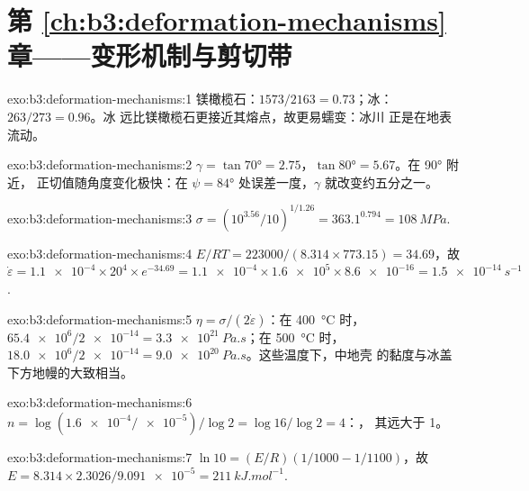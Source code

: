 \section*{第 \ref{ch:b3:deformation-mechanisms} 章——变形机制与剪切带}

\begin{solution}{exo:b3:deformation-mechanisms:1}
镁橄榄石：$1573/2163 = 0.73$；冰：$263/273 = 0.96$。冰
远比镁橄榄石更接近其熔点，故更易蠕变：冰川
正是在地表流动。
\end{solution}

\begin{solution}{exo:b3:deformation-mechanisms:2}
$\gamma = \tan\ang{70} = 2.75$，$\tan\ang{80} = 5.67$。在 \ang{90} 附近，
正切值随角度变化极快：在 $\psi =
\ang{84}$ 处误差一度，$\gamma$ 就改变约五分之一。
\end{solution}

\begin{solution}{exo:b3:deformation-mechanisms:3}
$\sigma = (10^{3.56}/10)^{1/1.26} = 363.1^{0.794} = \qty{108}{MPa}$.
\end{solution}

\begin{solution}{exo:b3:deformation-mechanisms:4}
$E/RT = 223000/(8.314\times773.15) = 34.69$，故 $\dot\varepsilon =
\num{1.1e-4}\times20^4\times e^{-34.69} = \num{1.1e-4}\times\num{1.6e5}\times
\num{8.6e-16} = \qty{1.5e-14}{s^{-1}}$.
\end{solution}

\begin{solution}{exo:b3:deformation-mechanisms:5}
$\eta = \sigma/(2\dot\varepsilon)$：在 \qty{400}{\celsius} 时，$\num{65.4e6}/\num{2e-14} =
\qty{3.3e21}{Pa.s}$；在 \qty{500}{\celsius} 时，$\num{18.0e6}/\num{2e-14} =
\qty{9.0e20}{Pa.s}$。这些温度下，中地壳
的黏度与冰盖下方地幔的大致相当。
\end{solution}

\begin{solution}{exo:b3:deformation-mechanisms:6}
$n = \log(\num{1.6e-4}/\num{e-5})/\log2 = \log16/\log2 = 4$：，
其远大于 1。
\end{solution}

\begin{solution}{exo:b3:deformation-mechanisms:7}
$\ln10 = (E/R)(1/1000 - 1/1100)$，故 $E = 8.314\times2.3026/\num{9.091e-5} =
\qty{211}{kJ.mol^{-1}}$.
\end{solution}

